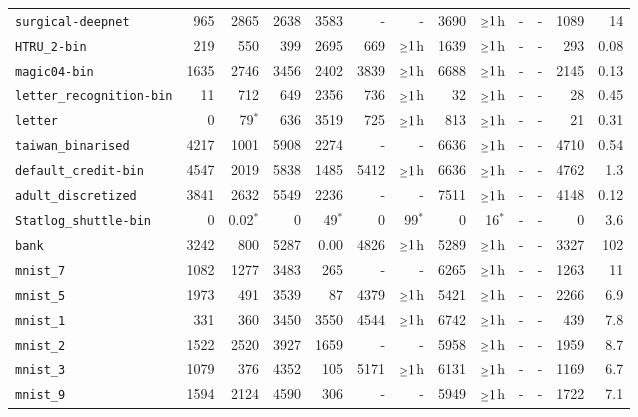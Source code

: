 \begin{tabular}{lrrrrrrrrrrrr}
\texttt{surgical-deepnet} & 965 & 2865 & 2638 & 3583 & - & - & 3690 & $\mathsmaller{\geq}1$h & - & - & 1089 & 14\\
\texttt{HTRU\_2-bin} & 219 & 550 & 399 & 2695 & 669 & $\mathsmaller{\geq}1$h & 1639 & $\mathsmaller{\geq}1$h & - & - & 293 & 0.08\\
\texttt{magic04-bin} & 1635 & 2746 & 3456 & 2402 & 3839 & $\mathsmaller{\geq}1$h & 6688 & $\mathsmaller{\geq}1$h & - & - & 2145 & 0.13\\
\texttt{letter\_recognition-bin} & 11 & 712 & 649 & 2356 & 736 & $\mathsmaller{\geq}1$h & 32 & $\mathsmaller{\geq}1$h & - & - & 28 & 0.45\\
\texttt{letter} & 0 & 79$^*$ & 636 & 3519 & 725 & $\mathsmaller{\geq}1$h & 813 & $\mathsmaller{\geq}1$h & - & - & 21 & 0.31\\
\texttt{taiwan\_binarised} & 4217 & 1001 & 5908 & 2274 & - & - & 6636 & $\mathsmaller{\geq}1$h & - & - & 4710 & 0.54\\
\texttt{default\_credit-bin} & 4547 & 2019 & 5838 & 1485 & 5412 & $\mathsmaller{\geq}1$h & 6636 & $\mathsmaller{\geq}1$h & - & - & 4762 & 1.3\\
\texttt{adult\_discretized} & 3841 & 2632 & 5549 & 2236 & - & - & 7511 & $\mathsmaller{\geq}1$h & - & - & 4148 & 0.12\\
\texttt{Statlog\_shuttle-bin} & 0 & 0.02$^*$ & 0 & 49$^*$ & 0 & 99$^*$ & 0 & 16$^*$ & - & - & 0 & 3.6\\
\texttt{bank} & 3242 & 800 & 5287 & 0.00 & 4826 & $\mathsmaller{\geq}1$h & 5289 & $\mathsmaller{\geq}1$h & - & - & 3327 & 102\\
\texttt{mnist\_7} & 1082 & 1277 & 3483 & 265 & - & - & 6265 & $\mathsmaller{\geq}1$h & - & - & 1263 & 11\\
\texttt{mnist\_5} & 1973 & 491 & 3539 & 87 & 4379 & $\mathsmaller{\geq}1$h & 5421 & $\mathsmaller{\geq}1$h & - & - & 2266 & 6.9\\
\texttt{mnist\_1} & 331 & 360 & 3450 & 3550 & 4544 & $\mathsmaller{\geq}1$h & 6742 & $\mathsmaller{\geq}1$h & - & - & 439 & 7.8\\
\texttt{mnist\_2} & 1522 & 2520 & 3927 & 1659 & - & - & 5958 & $\mathsmaller{\geq}1$h & - & - & 1959 & 8.7\\
\texttt{mnist\_3} & 1079 & 376 & 4352 & 105 & 5171 & $\mathsmaller{\geq}1$h & 6131 & $\mathsmaller{\geq}1$h & - & - & 1169 & 6.7\\
\texttt{mnist\_9} & 1594 & 2124 & 4590 & 306 & - & - & 5949 & $\mathsmaller{\geq}1$h & - & - & 1722 & 7.1\\

\end{tabular}
